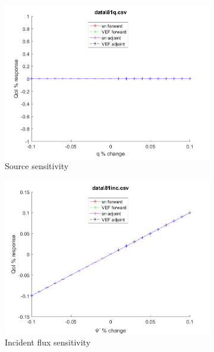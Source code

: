 \documentclass{article}
\begin{document}
\begin{figure}[H]
\label{Case81Sens}
\centering
\begin{subfigure}{.5\textwidth}
  \centering
  \includegraphics[width=.98\linewidth]{IanProposal/figures2/81qSens.png}
  \caption{Source sensitivity}
  \label{fig:sfig1}
\end{subfigure}%
\begin{subfigure}{.5\textwidth}
  \centering
  \includegraphics[width=.98\linewidth]{IanProposal/figures2/81incSens.png}
  \caption{Incident flux sensitivity}
  \label{fig:sfig4}
\end{subfigure}%
\\
\begin{subfigure}{.5\textwidth}
  \centering

\end{subfigure}
\end{figure}
\end{document}
